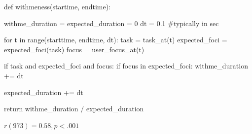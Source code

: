 \documentclass[compress]{beamer}
\begin{document}
{\begin{frame}[plain]{}
\begin{center}
    \end{center}
\end{frame}

\begin{frame}[fragile]{}
\begin{pythoncode}

def withmeness(startime, endtime):

    withme_duration = expected_duration = 0
    dt = 0.1 #typically in sec

    for t in range(starttime, endtime, dt):
        task = task_at(t)
        expected_foci = expected_foci(task)
        focus = user_focus_at(t)

        if task and expected_foci and focus:
            if focus in expected_foci:
                withme_duration += dt

            expected_duration += dt

    return withme_duration / expected_duration

\end{pythoncode}

\end{frame}

{
    \begin{frame}{}
        \vspace{6cm}
        \begin{center}
        $r(973) = 0.58, p < .001$
            
        \end{center}
    \end{frame}

}

}
\end{document}
